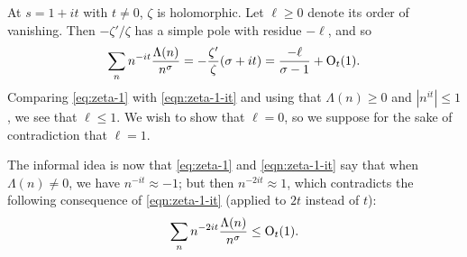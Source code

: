 \documentclass[reqno]{amsart} 
\begin{document}
At $s = 1 + it$ with $t \neq 0$, $\zeta$ is holomorphic.  Let $\ell \geq 0$ denote its order of vanishing.  Then $ - \zeta ' / \zeta$ has a simple pole with residue $- \ell$, and so
\begin{equation}\label{eqn:zeta-1-it}
  \sum_{n}
  n^{-i t}
  \frac{\Lambda(n)}{n^{\sigma} }
  = - \frac{\zeta '}{ \zeta } (\sigma + i t)
  = \frac{-\ell }{\sigma - 1} + \operatorname{O}_t(1).
\end{equation}
Comparing \eqref{eq:zeta-1} with \eqref{eqn:zeta-1-it} and using that $\Lambda(n) \geq 0$ and $|n^{i t}| \leq 1$, we see that $\ell \leq 1$.  We wish to show that $\ell = 0$, so we suppose for the sake of contradiction that $\ell = 1$.

The informal idea is now that \eqref{eq:zeta-1} and \eqref{eqn:zeta-1-it} say that when $\Lambda(n) \neq 0$, we have $n^{-i t} \approx -1$; but then $n^{- 2 i t} \approx 1$, which contradicts the following consequence of \eqref{eqn:zeta-1-it} (applied to $2 t$ instead of $t$):
\begin{equation}\label{eq:upper-zeta-1-2it}
  \sum_{n}
  n^{-2 i t}
  \frac{\Lambda(n)}{n^{\sigma} }
  \leq \operatorname{O}_t(1).
\end{equation}
\end{document}
